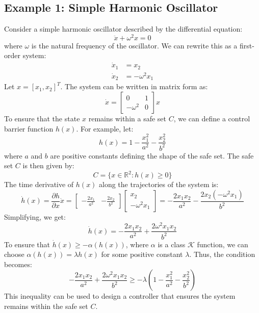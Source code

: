 \documentclass[12pt]{article}
\begin{document}
\subsection{Example 1: Simple Harmonic Oscillator}
Consider a simple harmonic oscillator described by the differential equation:
\[
\ddot{x} + \omega^2 x = 0
\]
where \( \omega \) is the natural frequency of the oscillator. We can rewrite this as a first-order system:
\[
\begin{aligned}
\dot{x}_1 &= x_2 \\
\dot{x}_2 &= -\omega^2 x_1
\end{aligned}
\]
Let \( x = [x_1, x_2]^T \). The system can be written in matrix form as:
\[
\dot{x} = \begin{bmatrix}
0 & 1 \\
-\omega^2 & 0
\end{bmatrix} x
\]
To ensure that the state \( x \) remains within a safe set \( C \), we can define a control barrier function \( h(x) \). For example, let:
\[
h(x) = 1 - \frac{x_1^2}{a^2} - \frac{x_2^2}{b^2}
\]
where \( a \) and \( b \) are positive constants defining the shape of the safe set. The safe set \( C \) is then given by:
\[
C = \{ x \in \mathbb{R}^2 : h(x) \geq 0 \}
\]
The time derivative of \( h(x) \) along the trajectories of the system is:
\[
\dot{h}(x) = \frac{\partial h}{\partial x} \dot{x} = \begin{bmatrix}
-\frac{2x_1}{a^2} & -\frac{2x_2}{b^2}
\end{bmatrix} \begin{bmatrix}
x_2 \\
-\omega^2 x_1
\end{bmatrix} = -\frac{2x_1 x_2}{a^2} - \frac{2x_2 (-\omega^2 x_1)}{b^2}
\]
Simplifying, we get:
\[
\dot{h}(x) = -\frac{2x_1 x_2}{a^2} + \frac{2\omega^2 x_1 x_2}{b^2}
\]
To ensure that \( \dot{h}(x) \geq -\alpha(h(x)) \), where \( \alpha \) is a class \( \mathcal{K} \) function, we can choose \( \alpha(h(x)) = \lambda h(x) \) for some positive constant \( \lambda \). Thus, the condition becomes:
\[
-\frac{2x_1 x_2}{a^2} + \frac{2\omega^2 x_1 x_2}{b^2} \geq -\lambda \left(1 - \frac{x_1^2}{a^2} - \frac{x_2^2}{b^2}\right)
\]
This inequality can be used to design a controller that ensures the system remains within the safe set \( C \).
\end{document}
